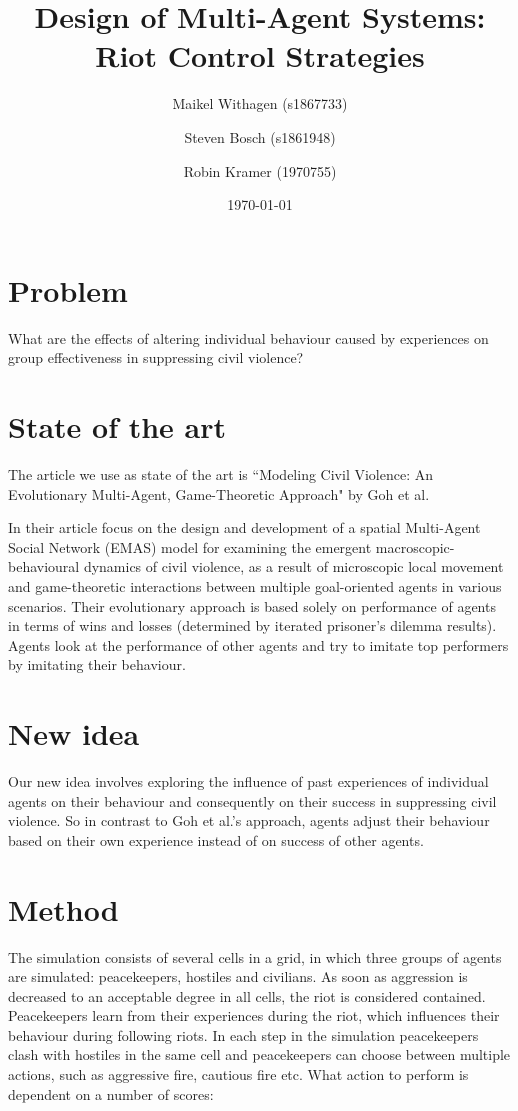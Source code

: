 \documentclass[11pt,a4paper]{article}
\title{Design of Multi-Agent Systems: Riot Control Strategies}
\author{Maikel Withagen (s1867733) \and Steven Bosch (s1861948) \and Robin Kramer (1970755)}
\date{\today}
\begin{document}
	\maketitle
	
	\section{Problem}
		What are the effects of altering individual behaviour caused by experiences on group effectiveness in suppressing civil violence?
		
	\section{State of the art}
		The article we use as state of the art is ``Modeling Civil Violence: An Evolutionary Multi-Agent, Game-Theoretic Approach" by Goh et al.
		
		In their article \citet{Goh} focus on the design and development of a spatial Multi-Agent Social Network (EMAS) model for examining the emergent macroscopic-behavioural dynamics of civil violence, as a result of microscopic local movement and game-theoretic interactions between multiple goal-oriented agents in various scenarios. Their evolutionary approach is based solely on performance of agents in terms of wins and losses (determined by iterated prisoner's dilemma results). Agents look at the performance of other agents and try to imitate top performers by imitating their behaviour. 
		
	\section{New idea}
		Our new idea involves exploring the influence of past experiences of individual agents on their behaviour and consequently on their success in suppressing civil violence. So in contrast to Goh et al.'s approach, agents adjust their behaviour based on their own experience instead of on success of other agents. 
		
	\section{Method}
		The simulation consists of several cells in a grid, in which three groups of agents are simulated: peacekeepers, hostiles and civilians. As soon as aggression is decreased to an acceptable degree in all cells, the riot is considered contained. Peacekeepers learn from their experiences during the riot, which influences their behaviour during following riots. In each step in the simulation peacekeepers clash with hostiles in the same cell and peacekeepers can choose between multiple actions, such as aggressive fire, cautious fire etc. What action to perform is dependent on a number of scores:
		
\end{document}
